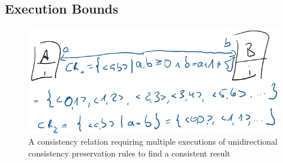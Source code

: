 

\subsection{Execution Bounds} %
\label{chap:synchronization:combination:bounds}

\begin{figure}
    \centering
    \includegraphics[width=\textwidth]{figures/correctness/synchronization/multiple_unidirectional_execution.png}
    \caption[Multiple execution of consistency preservation rules]{A consistency relation requiring multiple executions of unidirectional consistency preservation rules to find a consistent result}
    \label{fig:synchronization:multiple_unidirectional_execution}
\end{figure}

